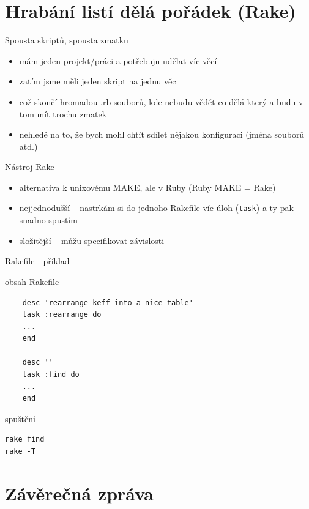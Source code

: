\documentclass{beamer}
\begin{document}
\section{Hrabání listí dělá pořádek (Rake)}

\begin{frame}{Spousta skriptů, spousta zmatku}
  \begin{itemize}
    \item mám jeden projekt/práci a potřebuju udělat víc věcí
    \item zatím jsme měli jeden skript na jednu věc
    \item což skončí hromadou .rb souborů, kde nebudu vědět co dělá který a budu v tom mít trochu zmatek
    \item nehledě na to, že bych mohl chtít sdílet nějakou konfiguraci (jména souborů atd.)
  \end{itemize}
\end{frame}

\begin{frame}{Nástroj Rake}
  \begin{itemize}
    \item alternativa k unixovému MAKE, ale v Ruby (Ruby MAKE = Rake)
    \item nejjednodušší -- nastrkám si do jednoho Rakefile víc úloh (\texttt{task}) a ty pak snadno spustím
    \item složitější -- můžu specifikovat závislosti
  \end{itemize}
\end{frame}

\begin{frame}[fragile]{Rakefile - příklad}
  \begin{block}{obsah Rakefile}
        \scriptsize
    \begin{verbatim}
    desc 'rearrange keff into a nice table'
    task :rearrange do
    ...
    end

    desc ''
    task :find do
    ...
    end
    \end{verbatim}
  \end{block}
  \begin{block}{spuštění}
        \scriptsize
    \begin{verbatim}
rake find
rake -T
    \end{verbatim}
  \end{block}
\end{frame}

\section{Závěrečná zpráva}
\end{document}
